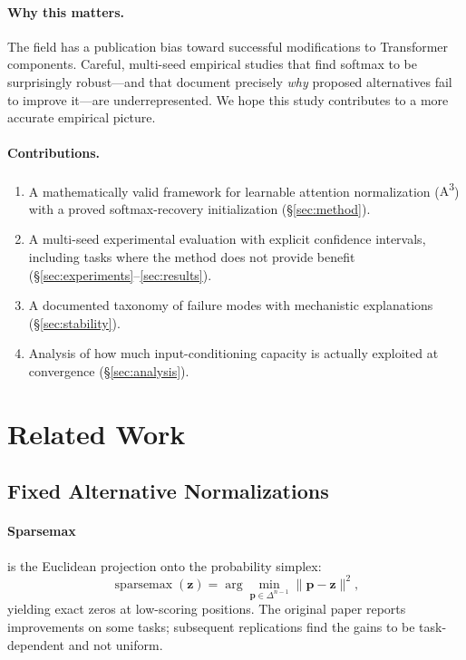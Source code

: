 \documentclass[11pt]{article}
\newcommand{\sparsemax}{\operatorname{sparsemax}}
\newcommand{\AAA}{\textsc{A\textsuperscript{3}}}
\newcommand{\bp}{\mathbf{p}}
\newcommand{\bz}{\mathbf{z}}
\begin{document}
\paragraph{Why this matters.} The field has a publication bias toward successful modifications to Transformer components. Careful, multi-seed empirical studies that find softmax to be surprisingly robust---and that document precisely \emph{why} proposed alternatives fail to improve it---are underrepresented. We hope this study contributes to a more accurate empirical picture.

\paragraph{Contributions.}
\begin{enumerate}[leftmargin=1.5em]
  \item A mathematically valid framework for learnable attention normalization (\AAA{}) with a proved softmax-recovery initialization (\S\ref{sec:method}).
  \item A multi-seed experimental evaluation with explicit confidence intervals, including tasks where the method does not provide benefit (\S\ref{sec:experiments}--\ref{sec:results}).
  \item A documented taxonomy of failure modes with mechanistic explanations (\S\ref{sec:stability}).
  \item Analysis of how much input-conditioning capacity is actually exploited at convergence (\S\ref{sec:analysis}).
\end{enumerate}

\section{Related Work}
\label{sec:related}

\subsection{Fixed Alternative Normalizations}

\paragraph{Sparsemax} \citep{martins2016softmax} is the Euclidean projection onto the probability simplex:
\begin{equation}
  \sparsemax(\bz) = \arg\min_{\bp \in \Delta^{n-1}} \|\bp - \bz\|^2,
\end{equation}
yielding exact zeros at low-scoring positions. The original paper reports improvements on some tasks; subsequent replications find the gains to be task-dependent and not uniform.
\end{document}
